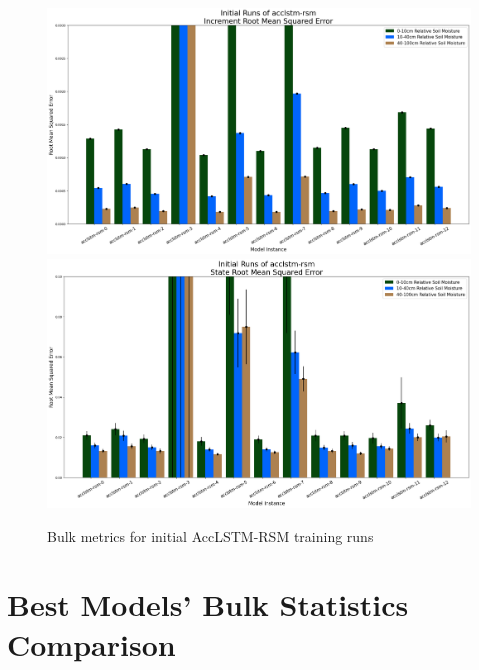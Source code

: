 \begin{figure}[hp!]
    \includegraphics[width=.48\linewidth,draft=false]{figures/efficiency_initial-best/eval_test_efficiency_initial-acclstm-rsm_mse_res.png}
    \includegraphics[width=.48\linewidth,draft=false]{figures/efficiency_initial-best/eval_test_efficiency_initial-acclstm-rsm_mse_state.png}

    \caption{Bulk metrics for initial AccLSTM-RSM training runs}
    \label{model-init-acclstm-rsm}
\end{figure}

\section{Best Models' Bulk Statistics Comparison}

